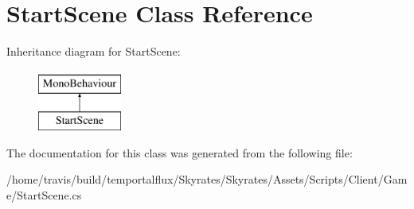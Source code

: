 \hypertarget{class_start_scene}{\section{Start\-Scene Class Reference}
\label{class_start_scene}
}
Inheritance diagram for Start\-Scene\-:\begin{figure}[H]
\begin{center}
\leavevmode
\includegraphics[height=2.000000cm]{class_start_scene}
\end{center}
\end{figure}


The documentation for this class was generated from the following file\-:\begin{DoxyCompactItemize}
\item 
/home/travis/build/temportalflux/\-Skyrates/\-Skyrates/\-Assets/\-Scripts/\-Client/\-Game/Start\-Scene.\-cs\end{DoxyCompactItemize}
